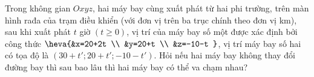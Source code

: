 \begin{ex}%
	Trong không gian $Oxyz$, hai máy bay cùng xuất phát từ hai phi trường, trên màn hình rađa của trạm điều khiển (với đơn vị trên ba trục chính theo đơn vị km), sau khi xuất phát $ t$ giờ $(t\ge 0)$, vị trí của máy bay số một được xác định bởi công thức $\heva{&x=20+2t \\ &y=20+t \\ &z=-10-t }$, vị trí máy bay số hai có tọa độ là $(30+t';20+t';-10-t')$. Hỏi nếu hai máy bay không thay đổi đường bay thì sau bao lâu thì hai máy bay có thể va chạm nhau?
	\end{ex}

